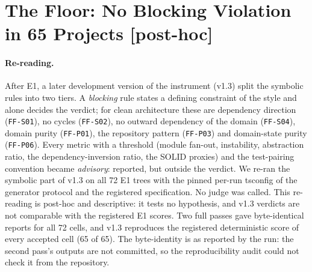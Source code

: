 \documentclass[10pt,a4paper]{article}
\newcommand{\ph}{\textsf{\scriptsize[post-hoc]}}    %
\newcommand{\ff}[1]{\texttt{\small #1}}
\begin{document}
\section{The Floor: No Blocking Violation in 65 Projects \ph{}}\label{sec:floor}

\paragraph{Re-reading.} After E1, a later development version of the instrument (v1.3) split the symbolic rules
into two tiers. A \emph{blocking} rule states a defining constraint of the style and alone decides the verdict; for
clean architecture these are dependency direction (\ff{FF-S01}), no cycles (\ff{FF-S02}), no outward dependency of
the domain (\ff{FF-S04}), domain purity (\ff{FF-P01}), the repository pattern (\ff{FF-P03}) and domain-state purity
(\ff{FF-P06}). Every metric with a threshold (module fan-out, instability, abstraction ratio, the dependency-inversion
ratio, the SOLID proxies) and the test-pairing convention became \emph{advisory}: reported, but outside the verdict.
We re-ran the symbolic part of v1.3 on all 72 E1 trees with the pinned per-run tsconfig of the generator protocol and
the registered specification. No judge was called. This re-reading is post-hoc and descriptive: it tests no
hypothesis, and v1.3 verdicts are not comparable with the registered E1 scores. Two full passes gave byte-identical
reports for all 72 cells, and v1.3 reproduces the registered deterministic score of every accepted cell (65 of 65).
The byte-identity is as reported by the run: the second pass's outputs are not committed, so the reproducibility audit
could not check it from the repository.
\end{document}

